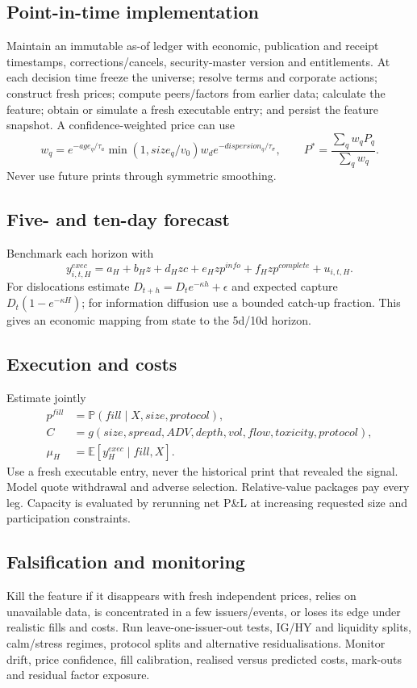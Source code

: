 \documentclass[10pt]{article}
\newcommand{\E}{\mathbb{E}}\newcommand{\Pp}{\mathbb{P}}
\begin{document}
\subsection{Point-in-time implementation}
Maintain an immutable as-of ledger with economic, publication and receipt timestamps, corrections/cancels, security-master version and entitlements. At each decision time freeze the universe; resolve terms and corporate actions; construct fresh prices; compute peers/factors from earlier data; calculate the feature; obtain or simulate a fresh executable entry; and persist the feature snapshot. A confidence-weighted price can use
\[w_q=e^{-age_q/\tau_a}\min(1,size_q/v_0)w_d e^{-dispersion_q/\tau_\sigma},\qquad P^*=\frac{\sum_qw_qP_q}{\sum_qw_q}.\]
Never use future prints through symmetric smoothing.

\subsection{Five- and ten-day forecast}
Benchmark each horizon with
\[y^{exec}_{i,t,H}=a_H+b_Hz+d_Hzc+e_Hzp^{info}+f_Hzp^{complete}+u_{i,t,H}.\]
For dislocations estimate $D_{t+h}=D_te^{-\kappa h}+\epsilon$ and expected capture $D_t(1-e^{-\kappa H})$; for information diffusion use a bounded catch-up fraction. This gives an economic mapping from state to the 5d/10d horizon.

\subsection{Execution and costs}
Estimate jointly
\begin{align}
p^{fill}&=\Pp(fill\mid X,size,protocol),\\
C&=g(size,spread,ADV,depth,vol,flow,toxicity,protocol),\\
\mu_H&=\E[y^{exec}_H\mid fill,X].
\end{align}
Use a fresh executable entry, never the historical print that revealed the signal. Model quote withdrawal and adverse selection. Relative-value packages pay every leg. Capacity is evaluated by rerunning net P\&L at increasing requested size and participation constraints.

\subsection{Falsification and monitoring}
Kill the feature if it disappears with fresh independent prices, relies on unavailable data, is concentrated in a few issuers/events, or loses its edge under realistic fills and costs. Run leave-one-issuer-out tests, IG/HY and liquidity splits, calm/stress regimes, protocol splits and alternative residualisations. Monitor drift, price confidence, fill calibration, realised versus predicted costs, mark-outs and residual factor exposure.
\end{document}
